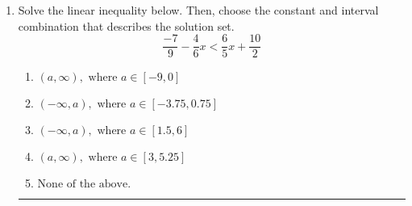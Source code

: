 \documentclass[14pt]{extbook}
\newcommand{\litem}[1]{\item#1\hspace*{-1cm}\rule{\textwidth}{0.4pt}}
\begin{document}
\begin{enumerate}
{\begin{enumerate}[label=\Alph*.]
\end{enumerate} }
\litem{
Solve the linear inequality below. Then, choose the constant and interval combination that describes the solution set.\[ \frac{-7}{9} - \frac{4}{6} x < \frac{6}{5} x + \frac{10}{2} \]\begin{enumerate}[label=\Alph*.]
\item \( (a, \infty), \text{ where } a \in [-9, 0] \)
\item \( (-\infty, a), \text{ where } a \in [-3.75, 0.75] \)
\item \( (-\infty, a), \text{ where } a \in [1.5, 6] \)
\item \( (a, \infty), \text{ where } a \in [3, 5.25] \)
\item \( \text{None of the above}. \)

\end{enumerate} }
\end{enumerate}
\end{document}
